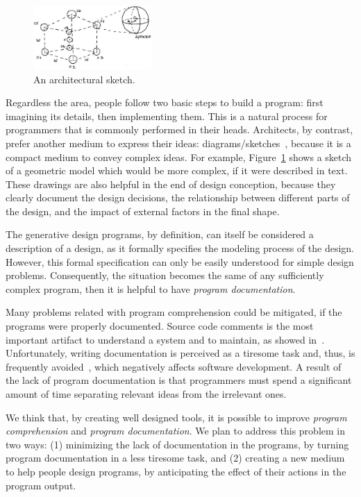 \begin{figure}
  \vspace{-20pt}
  \begin{center}
    \includegraphics[width=0.4\textwidth]{img/cube-sketch}
  \end{center}
  \vspace{-15pt}
 \caption{An architectural sketch.}  
  \vspace{-20pt}
    \label{fig:sketch}
\end{figure}

Regardless the area, people follow two basic steps to build a program: first imagining its details, then implementing them. This is a natural process for programmers that is commonly performed in their heads. Architects, by contrast, prefer another medium to express their ideas: diagrams/sketches~\cite{do2001thinking}, because it is a compact medium to convey complex ideas. For example, Figure~\ref{fig:sketch} shows a sketch of a geometric model which would be more complex, if it were described in text. These drawings are also helpful in the end of design conception, because they clearly document the design decisions, the relationship between different parts of the design, and the impact of external factors in the final shape.

The generative design programs, by definition, can itself be considered a description of a design, as it formally specifies the modeling process of the design. However, this formal specification can only be easily understood for simple design problems. Consequently, the situation becomes the same of any sufficiently complex program, then it is helpful to have \textit{program documentation}.

Many problems related with program comprehension could be mitigated, if the programs were properly documented. Source code comments is the most important artifact to understand a system and to maintain, as showed in~\cite{de2005study}. Unfortunately, writing documentation is perceived as a tiresome task and, thus, is frequently avoided~\cite{sousa1998survey}, which negatively affects software development. A result of the lack of program documentation is that programmers must spend a significant amount of time separating relevant ideas from the irrelevant ones.

We think that, by creating well designed tools, it is possible to improve \textit{program comprehension} and \textit{program documentation}. We plan to address this problem in two ways: (1) minimizing the lack of documentation in the programs, by turning program documentation in a less tiresome task, and (2) creating a new medium to help people design programs, by anticipating the effect of their actions in the program output.
